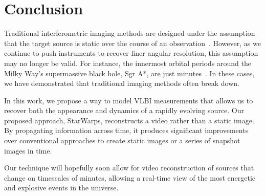 %



\section{Conclusion}
\label{sec:conclusion}

Traditional interferometric imaging methods are designed under the assumption that the target source is static over the course of an observation~\cite{TMS}. However, as we continue to push instruments to recover finer angular resolution, this assumption may no longer be valid. For instance, the innermost orbital periods around the Milky Way's supermassive black hole, Sgr A*, are just minutes~\cite{orbitalperiod}. In these cases, we have demonstrated that traditional imaging methods often break down. 

In this work, we propose a way to model VLBI measurements that allows us to recover both the appearance and dynamics of a rapidly evolving source. Our proposed approach, StarWarps, reconstructs a video rather than a static image. By propagating information across time, it produces significant improvements over conventional approaches to create static images or a series of snapshot images in time.

Our technique will hopefully soon allow for video reconstruction of sources that change on timescales of minutes, allowing a real-time view of the most energetic and explosive events in the universe. 






 
